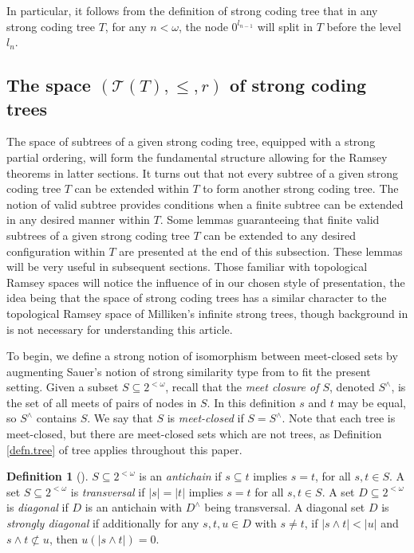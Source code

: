 \documentclass{amsart}
\theoremstyle{remark}
\theoremstyle{definition}
\newtheorem{defn}[thm]{Definition}
\theoremstyle{remark}
\newcommand{\om}{\omega}
\newcommand{\sse}{\subseteq}
\begin{document}
In  particular,
it follows from the definition of strong coding tree that   in any strong coding tree $T$,
for any $n<\om$,
the node $0^{l_{n-1}}$
will split  in $T$ before the level $l_n$.




\subsection{The space $(\mathcal{T}(T),\le,r)$ of strong coding trees}\label{subsection4.2}




The space of  subtrees of a given strong coding tree, equipped with a strong partial ordering, will
form the fundamental structure allowing for the Ramsey theorems in latter sections.
It turns out that not every subtree of a given strong coding tree $T$ can be extended within $T$ to form another strong coding tree.
The notion of valid subtree provides conditions when a finite subtree can be extended in any desired manner within $T$.
Some lemmas guaranteeing that  finite
valid subtrees
of a given strong coding tree $T$ can be extended
 to any desired configuration within $T$
 are presented at the end of this subsection.
These lemmas will be very useful in  subsequent sections.
Those familiar with topological Ramsey spaces
will notice  the   influence of \cite{TodorcevicBK10}  in our chosen style of presentation,
the idea being that  the space of strong coding trees
has a similar character  to the topological Ramsey space of Milliken's infinite strong trees,
though
background in \cite{TodorcevicBK10} is not  necessary for understanding this article.





To begin, we define a strong notion of isomorphism between meet-closed sets  by  augmenting
Sauer's
 notion of strong similarity type
from   \cite{Sauer06} to fit the present setting.
Given a subset $S\sse 2^{<\om}$,
recall that
 the {\em meet closure of $S$}, denoted $S^{\wedge}$,
is the set of all meets of pairs of nodes in $S$.
In this definition $s$ and $t$ may be equal, so  $S^{\wedge}$ contains $S$.
We say that  $S$ is {\em meet-closed} if $S=S^{\wedge}$.
Note that each tree  is meet-closed, but there are meet-closed sets which are not trees,
as
 Definition \ref{defn.tree} of tree applies throughout this paper.


\begin{defn}[\cite{Sauer06}]\label{def.2.2.Sauer}
$S\sse 2^{<\om}$ is an {\em antichain} if $s\sse t$ implies $s=t$, for all $s,t\in S$.
A set $S\sse 2^{<\om}$ is {\em transversal} if $|s|=|t|$ implies $s=t$ for all $s,t\in S$.
A set $D\sse 2^{<\om}$ is {\em diagonal} if $D$  is an antichain with  $D^{\wedge}$ being transversal.
A diagonal set
$D$ is {\em strongly diagonal} if additionally  for any $s,t,u\in D$ with $s\ne t$, if $|s\wedge t|<|u|$ and $s\wedge t\not\subset u$, then $u(|s\wedge t|)=0$.
\end{defn}
\end{document}
